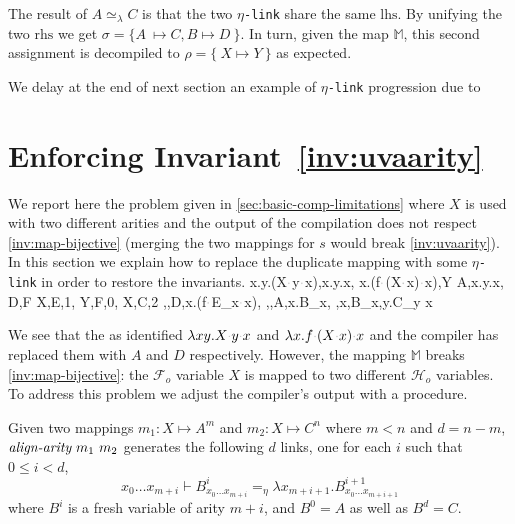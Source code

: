 \documentclass[sigconf,natbib=false,review]{acmart}
\newcommand{\appsep}{\ensuremath{\textcolor{lightgray}{\cdot}}}
\newcommand{\UnifRel}{\ensuremath{\simeq}}
\newcommand{\Ue}{\ensuremath{\UnifRel_\lambda}\xspace}
\newcommand{\linkMacro}[1]{\ensuremath{#1}\texttt{-link}\xspace}
\newcommand{\linketa} {\linkMacro{\eta}}
\newcommand{\Fo}{\ensuremath{\mathcal{F}_{\!o}\xspace}} %
\newcommand{\Ho}{\ensuremath{\mathcal{H}_o}\xspace}
\newcommand{\linketaM}[3]{\ensuremath{#1 \vdash #2 =_\eta #3}}
\newcommand{\lhs}{\ensuremath{\mathrm{lhs}}\xspace}
\newcommand{\rhs}{\ensuremath{\mathrm{rhs}}\xspace}
\newcommand{\mapStore}{\ensuremath{\mathbb{M}}\xspace}
\begin{document}
\noindent
The result of $A \Ue{} C$ is that the two \linketa share the same \lhs.
By unifying the two \rhs we get
$\sigma = \{ A~ \mapsto C, B \mapsto D ~\}$.
In turn, given the map \mapStore, this second assignment is decompiled to
$\rho = \{~ X \mapsto Y ~\}$ as expected.

We delay at the end of  next section an example of \linketa progression due to
\progressetaright


\section{Enforcing Invariant~\ref{inv:uvaarity}}
\label{sec:invariant1}

We report here the problem given in \cref{sec:basic-comp-limitations} where
$X$ is used with two different arities and the output of the compilation does
not respect \cref{inv:map-bijective} (merging the two mappings
for $s$ would break \cref{inv:uvaarity}).
In this section we explain how to replace the duplicate mapping with some
\linketa{} in order to restore the invariants.
\printAlll
  {{{\lambda x.\lambda y.(X\appsep y\appsep x),\lambda x.\lambda y.x},
    {\lambda x.(f\appsep (X\appsep x)\appsep x),Y}}}
  {{{A,\lambda x.\lambda y.x},
    {D,F}}}
  {{{X,E,1},
    {Y,F,0},
    {X,C,2}}}
  {{{\eta,,D,\lambda x.(f\appsep E_{x}\appsep x)},
    {\eta,,A,\lambda x.B_{x}},
    {\eta,x,B_{x},\lambda y.C_{y x}}}}

We see that the  as identified $\lambda xy.X \appsep y \appsep
x$ and $\lambda x.f\appsep (X \appsep x) \appsep x$ and the compiler has
replaced them with $A$ and $D$ respectively.
However, the mapping \mapStore breaks \cref{inv:map-bijective}: the \Fo{}
variable $X$ is mapped to two different \Ho variables. To address this problem
we adjust the compiler's output with a  procedure.

\newcommand{\alignarity}{\emph{align-arity}}
\begin{definition}[\alignarity] Given two mappings
  $m_1 : X \mapsto A^m$ and
  $m_2 : X \mapsto C^n$ where $m < n$ and $d = n - m$,
  $\alignarity{}~ m_1 ~ m_2$ generates the following $d$ links, one
  for each $i$ such that $0 \leq i < d$,
\[%
  \linketaM{x_0 \ldots x_{m+i}}
           {B^i_{x_0 \ldots x_{m+i}}}
           {\lambda x_{m+i+1}.B^{i+1}_{x_0 \ldots x_{m+i+1}}}
\]%
where $B^i$ is a fresh variable of arity $m+i$, and $B^0 = A$ as well as $B^d = C$.
\end{definition}
\end{document}
